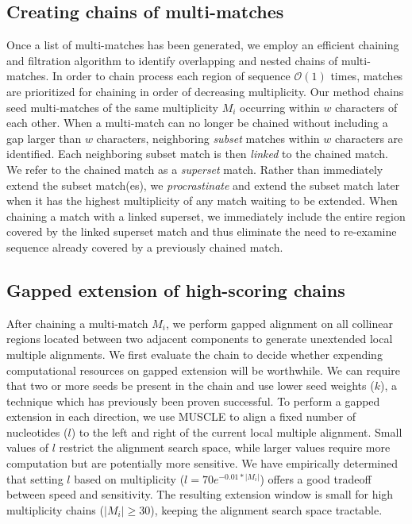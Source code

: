 \documentclass{ws-procs975x65}
\begin{document}
\subsection{Creating chains of multi-matches}
Once a list of multi-matches has been generated, we employ an
efficient chaining and filtration algorithm to identify overlapping
and nested chains of multi-matches\cite{ref-procrast}. In order to
chain process each region of sequence $\mathcal{O}(1)$ times, matches
are prioritized for chaining in order of decreasing multiplicity.  Our
method chains seed multi-matches of the same multiplicity $M_{i}$
occurring within $w$ characters of each other.  When a multi-match can
no longer be chained without including a gap larger than $w$
characters, neighboring \textit{subset} matches within $w$ characters
are identified. Each neighboring subset match is then \textit{linked}
to the chained match. We refer to the chained match as a
\textit{superset} match. Rather than immediately extend the subset
match(es), we \textit{procrastinate} and extend the subset match later
when it has the highest multiplicity of any match waiting to be
extended. When chaining a match with a linked superset, we immediately
include the entire region covered by the linked superset match and
thus eliminate the need to re-examine sequence already covered by a
previously chained match.

\subsection{Gapped extension of high-scoring chains}

After chaining a multi-match $M_i$, we perform gapped alignment on all
collinear regions located between two adjacent components to generate
unextended local multiple alignments. We first evaluate the chain to
decide whether expending computational resources on gapped extension
will be worthwhile. We can require that two or more seeds be present
in the chain and use lower seed weights ($k$), a technique which has
previously been proven
successful\cite{ref-blastz,ref-gappedblast,ref-blat}.  To perform a
gapped extension in each direction, we use MUSCLE to align a fixed
number of nucleotides ($l$) to the left and right of the current local
multiple alignment.  Small values of $l$ restrict the alignment search
space, while larger values require more computation but are
potentially more sensitive.  We have empirically determined that
setting $l$ based on multiplicity ($l = 70e^{-0.01*|M_{i}|}$) offers a
good tradeoff between speed and sensitivity.  The resulting extension
window is small for high multiplicity chains ($|M_{i}|\geq 30$),
keeping the alignment search space tractable.
\end{document}
